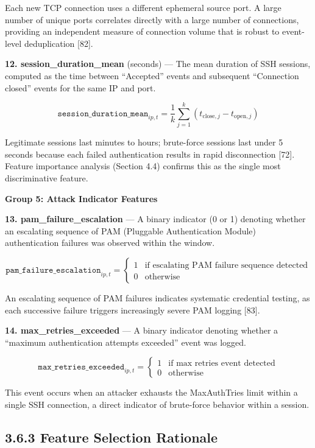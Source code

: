 \documentclass[
  a4paper]{report}
\begin{document}
Each new TCP connection uses a different ephemeral source port. A large
number of unique ports correlates directly with a large number of
connections, providing an independent measure of connection volume that
is robust to event-level deduplication {[}82{]}.

\textbf{12. session\_duration\_mean} (seconds) --- The mean duration of
SSH sessions, computed as the time between ``Accepted'' events and
subsequent ``Connection closed'' events for the same IP and port.

\[\texttt{session\_duration\_mean}_{ip,t} = \frac{1}{k} \sum_{j=1}^{k} (t_{\text{close},j} - t_{\text{open},j})\]

Legitimate sessions last minutes to hours; brute-force sessions last
under 5 seconds because each failed authentication results in rapid
disconnection {[}72{]}. Feature importance analysis (Section 4.4)
confirms this as the single most discriminative feature.

\textbf{Group 5: Attack Indicator Features}

\textbf{13. pam\_failure\_escalation} --- A binary indicator (0 or 1)
denoting whether an escalating sequence of PAM (Pluggable Authentication
Module) authentication failures was observed within the window.

\[\texttt{pam\_failure\_escalation}_{ip,t} = \begin{cases} 1 & \text{if escalating PAM failure sequence detected} \\ 0 & \text{otherwise} \end{cases}\]

An escalating sequence of PAM failures indicates systematic credential
testing, as each successive failure triggers increasingly severe PAM
logging {[}83{]}.

\textbf{14. max\_retries\_exceeded} --- A binary indicator denoting
whether a ``maximum authentication attempts exceeded'' event was logged.

\[\texttt{max\_retries\_exceeded}_{ip,t} = \begin{cases} 1 & \text{if max retries event detected} \\ 0 & \text{otherwise} \end{cases}\]

This event occurs when an attacker exhausts the MaxAuthTries limit
within a single SSH connection, a direct indicator of brute-force
behavior within a session.

\subsection{3.6.3 Feature Selection
Rationale}\label{feature-selection-rationale}
\end{document}
